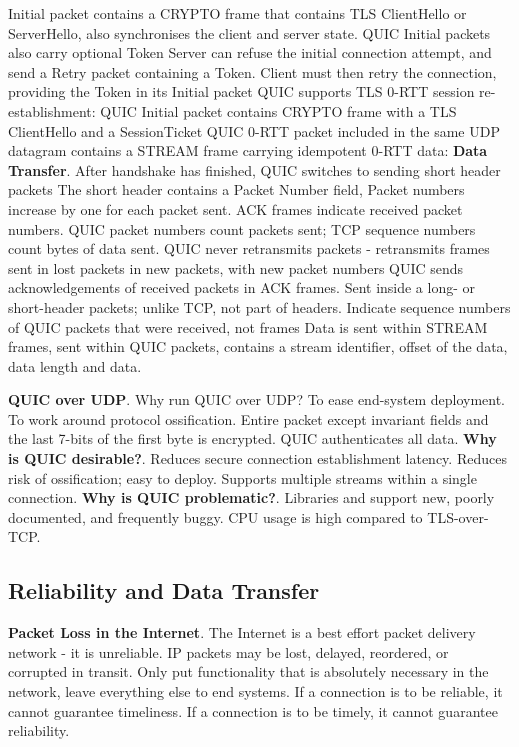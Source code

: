\documentclass{article}
\begin{document}
Initial packet contains a CRYPTO frame that contains TLS ClientHello or ServerHello, also synchronises the client and server state.
QUIC Initial packets also carry optional Token Server can refuse the initial connection attempt,
and send a Retry packet containing a Token.
Client must then retry the connection, providing the Token in its Initial packet
QUIC supports TLS 0-RTT session re-establishment: QUIC Initial packet contains CRYPTO frame with a TLS ClientHello
and a SessionTicket QUIC 0-RTT packet included in the same UDP datagram contains a STREAM frame carrying idempotent 0-RTT data:
\textbf{Data Transfer}. After handshake has finished, QUIC switches to sending short header packets
The short header contains a Packet Number field, Packet numbers increase by one for each packet sent.
ACK frames indicate received packet numbers. QUIC packet numbers count packets sent; TCP sequence numbers count bytes of data sent.
QUIC never retransmits packets {-} retransmits frames sent in lost packets in new packets, with new packet numbers
QUIC sends acknowledgements of received packets in ACK frames.
Sent inside a long- or short-header packets; unlike TCP, not part of headers.
Indicate sequence numbers of QUIC packets that were received, not frames
Data is sent within STREAM frames, sent within QUIC packets, contains a stream identifier, offset of the data, data length and data.

\vspace{\baselineskip}
\textbf{QUIC over UDP}. Why run QUIC over UDP\@? To ease end-system deployment.
To work around protocol ossification.
Entire packet except invariant fields and the last 7-bits of the first byte is encrypted.
QUIC authenticates all data.
\textbf{Why is QUIC desirable?}.
Reduces secure connection establishment latency.
Reduces risk of ossification; easy to deploy.
Supports multiple streams within a single connection.
\textbf{Why is QUIC problematic?}.
Libraries and support new, poorly documented, and frequently buggy.
CPU usage is high compared to TLS-over-TCP\@.

\clearpage

\subsection*{Reliability and Data Transfer}

\textbf{Packet Loss in the Internet}.
The Internet is a best effort packet delivery network {-} it is unreliable.
IP packets may be lost, delayed, reordered, or corrupted in transit.
Only put functionality that is absolutely necessary in the network, leave everything else to end systems.
If a connection is to be reliable, it cannot guarantee timeliness.
If a connection is to be timely, it cannot guarantee reliability.
\end{document}
